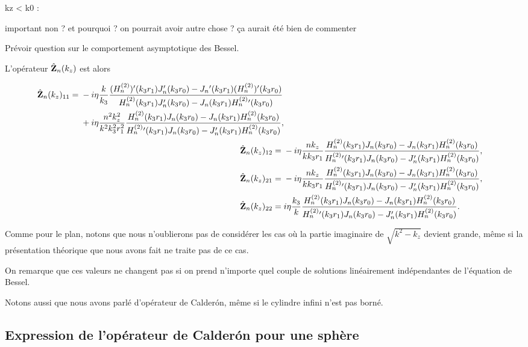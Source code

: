 \begin{REM}
  kz < k0 :

  important non ? et pourquoi ? on pourrait avoir autre chose ? ça aurait été bien de commenter 
\end{REM}
\begin{REP}
  Prévoir question sur le comportement asymptotique des Bessel.
\end{REP}
      L'opérateur \(\hat{\mathbf{Z}}_n(k_z)\) est alors

      \newcommand{\Sni}{\frac{
        (H^{(2)}_n{})'(k_3r_1)J_n'(k_3r_0)-J_n{}'(k_3r_1)(H^{(2)}_n{})'(k_3r_0)
      }{
        H^{(2)}_n(k_3r_1)J_n'(k_3r_0)-J_n(k_3r_1)H^{(2)}_n{}'(k_3r_0)
      }}

      \newcommand{\Tni}{\frac{
        H^{(2)}_n(k_3r_1)J_n(k_3r_0)-J_n(k_3r_1)H^{(2)}_n(k_3r_0)
      }{
        H^{(2)}_n{}'(k_3r_1)J_n(k_3r_0)-J_n'(k_3r_1)H^{(2)}_n(k_3r_0)
      }}

      \begin{align*}
        \begin{split}
          \hat\mZ_n(k_z)_{11} ={}& - i\eta\frac{k}{k_3}\Sni
          \\
          {}& + i\eta\frac{n^2k_z^2}{k^2k_3^2r_1^2}\Tni,
        \end{split}
        \\
        \hat\mZ_n(k_z)_{12} ={}& -i\eta\frac{nk_z}{kk_3r_1}\Tni,
        \\
        \hat\mZ_n(k_z)_{21} ={}& -i\eta\frac{nk_z}{kk_3r_1}\Tni,
        \\
        \hat\mZ_n(k_z)_{22} ={}& i\eta\frac{k_3}{k}\Tni.
      \end{align*}

      Comme pour le plan, notons que nous n'oublierons pas de considérer les cas où la partie imaginaire de \(\sqrt{k^2-k_z}\) devient grande, même si la présentation théorique que nous avons fait ne traite pas de ce cas.

      On remarque que ces valeurs ne changent pas si on prend n'importe quel couple de solutions linéairement indépendantes de l'équation de Bessel.

      Notons aussi que nous avons parlé d'opérateur de Calderón, même si le cylindre infini n'est pas borné.

  \subsection{Expression de l'opérateur de Calderón pour une sphère}

